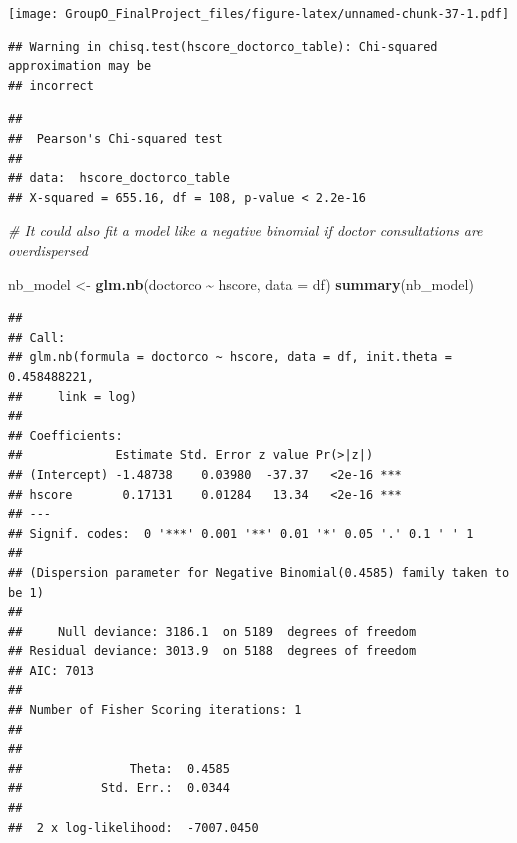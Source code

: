 \documentclass[
]{article}
\newenvironment{Shaded}{\begin{snugshade}}{\end{snugshade}}
\newcommand{\AttributeTok}[1]{\textcolor[rgb]{0.13,0.29,0.53}{#1}}
\newcommand{\CommentTok}[1]{\textcolor[rgb]{0.56,0.35,0.01}{\textit{#1}}}
\newcommand{\FunctionTok}[1]{\textcolor[rgb]{0.13,0.29,0.53}{\textbf{#1}}}
\newcommand{\NormalTok}[1]{#1}
\newcommand{\OtherTok}[1]{\textcolor[rgb]{0.56,0.35,0.01}{#1}}
\newcommand{\SpecialCharTok}[1]{\textcolor[rgb]{0.81,0.36,0.00}{\textbf{#1}}}
\begin{document}
\texttt{[image: GroupO\_FinalProject\_files/figure-latex/unnamed-chunk-37-1.pdf]}

\begin{Shaded}
\end{Shaded}

\begin{verbatim}
## Warning in chisq.test(hscore_doctorco_table): Chi-squared approximation may be
## incorrect
\end{verbatim}

\begin{verbatim}
## 
##  Pearson's Chi-squared test
## 
## data:  hscore_doctorco_table
## X-squared = 655.16, df = 108, p-value < 2.2e-16
\end{verbatim}

\begin{Shaded}
\begin{Highlighting}[]
\CommentTok{\# It could also fit a model like a negative binomial if doctor consultations are overdispersed}

\NormalTok{nb\_model }\OtherTok{\textless{}{-}} \FunctionTok{glm.nb}\NormalTok{(doctorco }\SpecialCharTok{\textasciitilde{}}\NormalTok{ hscore, }\AttributeTok{data =}\NormalTok{ df)}
\FunctionTok{summary}\NormalTok{(nb\_model)}
\end{Highlighting}
\end{Shaded}

\begin{verbatim}
## 
## Call:
## glm.nb(formula = doctorco ~ hscore, data = df, init.theta = 0.458488221, 
##     link = log)
## 
## Coefficients:
##             Estimate Std. Error z value Pr(>|z|)    
## (Intercept) -1.48738    0.03980  -37.37   <2e-16 ***
## hscore       0.17131    0.01284   13.34   <2e-16 ***
## ---
## Signif. codes:  0 '***' 0.001 '**' 0.01 '*' 0.05 '.' 0.1 ' ' 1
## 
## (Dispersion parameter for Negative Binomial(0.4585) family taken to be 1)
## 
##     Null deviance: 3186.1  on 5189  degrees of freedom
## Residual deviance: 3013.9  on 5188  degrees of freedom
## AIC: 7013
## 
## Number of Fisher Scoring iterations: 1
## 
## 
##               Theta:  0.4585 
##           Std. Err.:  0.0344 
## 
##  2 x log-likelihood:  -7007.0450
\end{verbatim}
\end{document}
